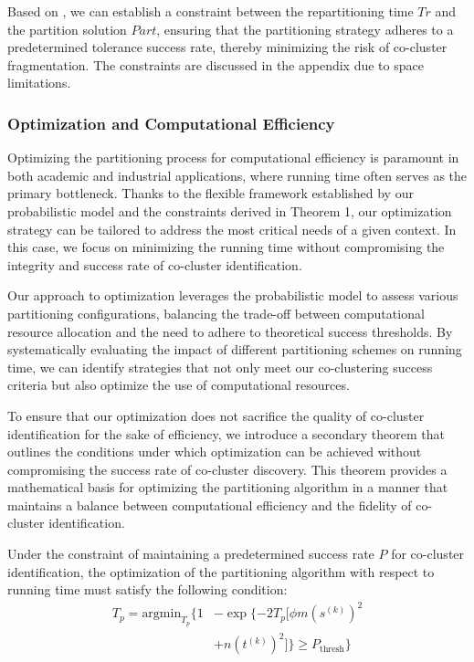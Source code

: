 \documentclass[journal]{IEEEtran}
\begin{document}
Based on , we can establish a constraint between the repartitioning time $Tr$ and the partition solution $Part$, ensuring that the partitioning strategy adheres to a predetermined tolerance success rate, thereby minimizing the risk of co-cluster fragmentation. The constraints are discussed in the appendix due to space limitations.

\subsubsection{Optimization and Computational Efficiency}

Optimizing the partitioning process for computational efficiency is paramount in both academic and industrial applications, where running time often serves as the primary bottleneck. Thanks to the flexible framework established by our probabilistic model and the constraints derived in Theorem 1, our optimization strategy can be tailored to address the most critical needs of a given context. In this case, we focus on minimizing the running time without compromising the integrity and success rate of co-cluster identification.

Our approach to optimization leverages the probabilistic model to assess various partitioning configurations, balancing the trade-off between computational resource allocation and the need to adhere to theoretical success thresholds. By systematically evaluating the impact of different partitioning schemes on running time, we can identify strategies that not only meet our co-clustering success criteria but also optimize the use of computational resources.

To ensure that our optimization does not sacrifice the quality of co-cluster identification for the sake of efficiency, we introduce a secondary theorem that outlines the conditions under which optimization can be achieved without compromising the success rate of co-cluster discovery. This theorem provides a mathematical basis for optimizing the partitioning algorithm in a manner that maintains a balance between computational efficiency and the fidelity of co-cluster identification.

Under the constraint of maintaining a predetermined success rate $P$ for co-cluster identification, the optimization of the partitioning algorithm with respect to running time must satisfy the following condition:
\begin{align*}
  T_p = \text{argmin}_{T_p} \{
  1 & - \exp \{ -2 T_p [\phi m (s^{(k)})^2         \\
    & + n (t^{(k)})^2] \} \ge P_{\text{thresh}} \}
\end{align*}
\end{document}
